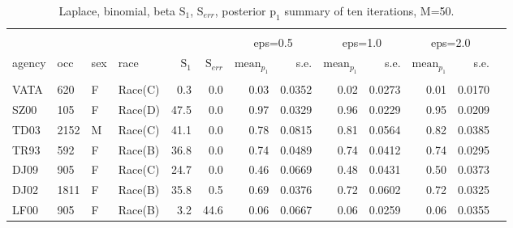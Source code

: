 \documentclass[10pt, letterpaper]{article}
\begin{document}
\begin{spacing}{1.0}
\begin{table}[h!]
    \centering
    \caption{Laplace, binomial, beta $\text{S}_1$, $\text{S}_{err}$, posterior $\text{p}_1$ summary of ten iterations, M=50.}
    \label{table:lbb-M50}
    \begin{tabular}{llllrrrrrrrrr}
        \hline\\[-10pt]
        & & & & & & \multicolumn{2}{c}{eps=0.5} & \multicolumn{2}{c}{eps=1.0} & \multicolumn{2}{c}{eps=2.0} \\
        agency & occ & sex & race & $\text{S}_1$ & $\text{S}_{err}$ & $\text{mean}_{p_1}$ & s.e. & $\text{mean}_{p_1}$ & s.e. & $\text{mean}_{p_1}$ & s.e. \\ 
        \hline\\[-6pt]
        VATA & 620 & F & Race(C) & 0.3 & 0.0 & 0.03 & 0.0352 & 0.02 & 0.0273 & 0.01 & 0.0170 \\ 
        SZ00 & 105 & F & Race(D) & 47.5 & 0.0 & 0.97 & 0.0329 & 0.96 & 0.0229 & 0.95 & 0.0209 \\ 
        TD03 & 2152 & M & Race(C) & 41.1 & 0.0 & 0.78 & 0.0815 & 0.81 & 0.0564 & 0.82 & 0.0385 \\ 
        TR93 & 592 & F & Race(B) & 36.8 & 0.0 & 0.74 & 0.0489 & 0.74 & 0.0412 & 0.74 & 0.0295 \\ 
        DJ09 & 905 & F & Race(C) & 24.7 & 0.0 & 0.46 & 0.0669 & 0.48 & 0.0431 & 0.50 & 0.0373 \\ 
        DJ02 & 1811 & F & Race(B) & 35.8 & 0.5 & 0.69 & 0.0376 & 0.72 & 0.0602 & 0.72 & 0.0325 \\ 
        LF00 & 905 & F & Race(B) & 3.2 & 44.6 & 0.06 & 0.0667 & 0.06 & 0.0259 & 0.06 & 0.0355 \\ 
        \hline
    \end{tabular}
\end{table}

\clearpage


\end{spacing}
\end{document}
